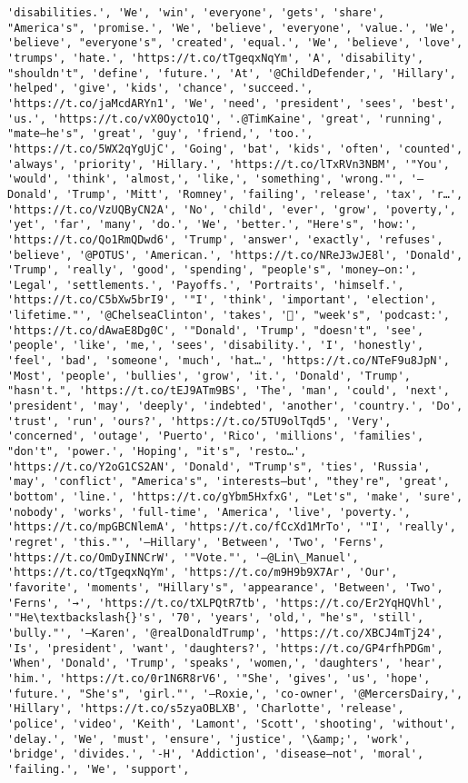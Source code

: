 \documentclass[11pt]{article}
\begin{document}
\begin{Verbatim}[commandchars=\\\{\}]
'disabilities.', 'We', 'win', 'everyone', 'gets', 'share', "America's", 'promise.', 'We', 'believe', 'everyone', 'value.', 'We', 'believe', "everyone's", 'created', 'equal.', 'We', 'believe', 'love', 'trumps', 'hate.', 'https://t.co/tTgeqxNqYm', 'A', 'disability', "shouldn't", 'define', 'future.', 'At', '@ChildDefender,', 'Hillary', 'helped', 'give', 'kids', 'chance', 'succeed.', 'https://t.co/jaMcdARYn1', 'We', 'need', 'president', 'sees', 'best', 'us.', 'https://t.co/vX0Oycto1Q', '.@TimKaine', 'great', 'running', "mate—he's", 'great', 'guy', 'friend,', 'too.', 'https://t.co/5WX2qYgUjC', 'Going', 'bat', 'kids', 'often', 'counted', 'always', 'priority', 'Hillary.', 'https://t.co/lTxRVn3NBM', '"You', 'would', 'think', 'almost,', 'like,', 'something', 'wrong."', '—Donald', 'Trump', 'Mitt', 'Romney', 'failing', 'release', 'tax', 'r…', 'https://t.co/VzUQByCN2A', 'No', 'child', 'ever', 'grow', 'poverty,', 'yet', 'far', 'many', 'do.', 'We', 'better.', "Here's", 'how:', 'https://t.co/Qo1RmQDwd6', 'Trump', 'answer', 'exactly', 'refuses', 'believe', '@POTUS', 'American.', 'https://t.co/NReJ3wJE8l', 'Donald', 'Trump', 'really', 'good', 'spending', "people's", 'money—on:', 'Legal', 'settlements.', 'Payoffs.', 'Portraits', 'himself.', 'https://t.co/C5bXw5brI9', '"I', 'think', 'important', 'election', 'lifetime."', '@ChelseaClinton', 'takes', '🎤', "week's", 'podcast:', 'https://t.co/dAwaE8Dg0C', '"Donald', 'Trump', "doesn't", 'see', 'people', 'like', 'me,', 'sees', 'disability.', 'I', 'honestly', 'feel', 'bad', 'someone', 'much', 'hat…', 'https://t.co/NTeF9u8JpN', 'Most', 'people', 'bullies', 'grow', 'it.', 'Donald', 'Trump', "hasn't.", 'https://t.co/tEJ9ATm9BS', 'The', 'man', 'could', 'next', 'president', 'may', 'deeply', 'indebted', 'another', 'country.', 'Do', 'trust', 'run', 'ours?', 'https://t.co/5TU9olTqd5', 'Very', 'concerned', 'outage', 'Puerto', 'Rico', 'millions', 'families', "don't", 'power.', 'Hoping', "it's", 'resto…', 'https://t.co/Y2oG1CS2AN', 'Donald', "Trump's", 'ties', 'Russia', 'may', 'conflict', "America's", 'interests—but', "they're", 'great', 'bottom', 'line.', 'https://t.co/gYbm5HxfxG', "Let's", 'make', 'sure', 'nobody', 'works', 'full-time', 'America', 'live', 'poverty.', 'https://t.co/mpGBCNlemA', 'https://t.co/fCcXd1MrTo', '"I', 'really', 'regret', 'this."', '—Hillary', 'Between', 'Two', 'Ferns', 'https://t.co/OmDyINNCrW', '"Vote."', '—@Lin\_Manuel', 'https://t.co/tTgeqxNqYm', 'https://t.co/m9H9b9X7Ar', 'Our', 'favorite', 'moments', "Hillary's", 'appearance', 'Between', 'Two', 'Ferns', '→', 'https://t.co/tXLPQtR7tb', 'https://t.co/Er2YqHQVhl', '"He\textbackslash{}'s', '70', 'years', 'old,', "he's", 'still', 'bully."', '—Karen', '@realDonaldTrump', 'https://t.co/XBCJ4mTj24', 'Is', 'president', 'want', 'daughters?', 'https://t.co/GP4rfhPDGm', 'When', 'Donald', 'Trump', 'speaks', 'women,', 'daughters', 'hear', 'him.', 'https://t.co/0r1N6R8rV6', '"She', 'gives', 'us', 'hope', 'future.', "She's", 'girl."', '—Roxie,', 'co-owner', '@MercersDairy,', 'Hillary', 'https://t.co/s5zyaOBLXB', 'Charlotte', 'release', 'police', 'video', 'Keith', 'Lamont', 'Scott', 'shooting', 'without', 'delay.', 'We', 'must', 'ensure', 'justice', '\&amp;', 'work', 'bridge', 'divides.', '-H', 'Addiction', 'disease—not', 'moral', 'failing.', 'We', 'support', 
\end{Verbatim}
\end{document}

